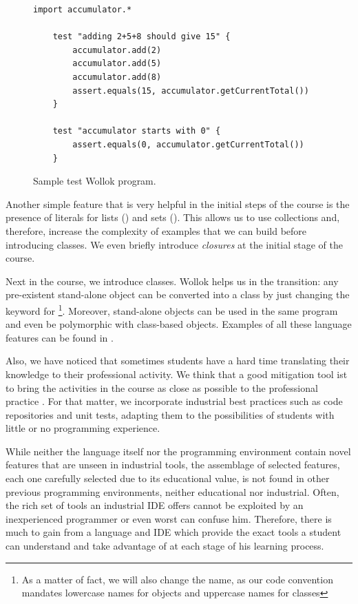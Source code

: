 \vspace{-3mm}
\begin{figure}[ht]
 \centering
 \begin{lstlisting}[language=Wollok]
 	import accumulator.*

	test "adding 2+5+8 should give 15" {
		accumulator.add(2)
		accumulator.add(5)
		accumulator.add(8)
		assert.equals(15, accumulator.getCurrentTotal())		
	}
   
	test "accumulator starts with 0" {
		assert.equals(0, accumulator.getCurrentTotal())
	}\end{lstlisting}
\vspace{-3mm}
\caption{\small Sample test Wollok program.}
\label{fig:test}
\end{figure}
\vspace{-3mm}

Another simple feature that is very helpful in the initial steps of the course is the presence of literals for lists (\eg \code{[1,2,3]}) and sets (\eg {}).
This allows us to use collections and, therefore, increase the complexity of examples that we can build before introducing classes.
We even briefly introduce \emph{closures} at the initial stage of the course.

Next in the course, we introduce classes.
Wollok helps us in the transition: any pre-existent stand-alone object can be converted into a class by just changing the keyword  for %
\footnote{As a matter of fact, we will also change the name, as our code convention mandates lowercase names for objects and uppercase names for classes}.
Moreover, stand-alone objects can be used in the same program and even be polymorphic with class-based objects.
Examples of all these language features can be found in \cite{passerini2017wollok}.

\medskip

Also, we have noticed that sometimes students
have a hard time translating their knowledge to their professional activity.
We think that a good mitigation tool ist to bring the activities in the course as close as possible to the professional practice \cite{McDermott2017AssessmentAuthenticity}.
For that matter, we incorporate industrial best practices such as code repositories and unit tests, 
adapting them to the possibilities of students with little or no programming experience.

While neither the language itself nor the programming environment contain novel features that are unseen in industrial tools,
the assemblage of selected features, each one carefully selected due to its educational value,
is not found in other previous programming environments, neither educational nor industrial.
Often, the rich set of tools an industrial IDE offers cannot be exploited by an inexperienced programmer or even worst can confuse him.
Therefore, there is much to gain from a language and IDE which provide the exact tools 
a student can understand and take advantage of at each stage of his learning process.


